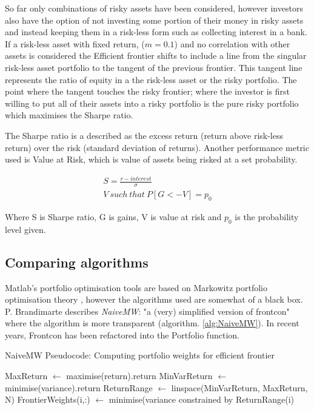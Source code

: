 \documentclass[a4paper,10pt, twocolumn]{article}
\newcommand*\Let[2]{\State #1 $\gets$ #2}
\begin{document}
So far only combinations of risky assets have been considered, however investors also have the option of not investing some portion of their money in risky assets and instead keeping them in a risk-less form such as collecting interest in a bank. If a risk-less asset with fixed return, ($m = 0.1$) and no correlation with other assets is considered the Efficient frontier shifts to include a line from the singular risk-less asset portfolio to the tangent of the previous frontier. This tangent line represents the ratio of equity in a the risk-less asset or the risky portfolio. The point where the tangent touches the risky frontier; where the investor is first willing to put all of their assets into a risky portfolio is the pure risky portfolio which maximises the Sharpe ratio. 

The Sharpe ratio is a described as the excess return (return above risk-less return) over the risk (standard deviation of returns). Another performance metric used is Value at Risk, which is value of assets being risked at a set probability.

\begin{align}
S = \frac{r - interest}{\sigma} \\
V  \ such\  that\   P[G < -V] = p_0
\label{eq:sharpe}
\end{align}

Where S is Sharpe ratio, G is gains, V is value at risk and $p_0$ is the probability level given. 


\subsection{Comparing algorithms}

Matlab's portfolio optimisation tools are based on Markowitz portfolio optimisation theory \cite{Portfolio}, however the algorithms used are somewhat of a black box. P. Brandimarte describes \textit{NaiveMW}: "a (very) simplified version of frontcon" \cite{TextBook} where the algorithm is more transparent (algorithm. \ref{alg:NaiveMW}). In recent years, Frontcon has been refactored into the Portfolio function. 

\begin{algorithm}
  \caption{NaiveMW Pseudocode: Computing portfolio weights for efficient frontier \cite{TextBook}
    \label{alg:NaiveMW}}
  \begin{algorithmic}[1]
    \Statex
      \Let{MaxReturn}{maximise(return).return} 
      \Let{MinVarReturn}{minimise(variance).return}
      \Let{ReturnRange}{linspace(MinVarReturn, MaxReturn, N)}
        \Let{FrontierWeights(i,:)}{minimise(variance constrained by ReturnRange(i)} 
      \EndFor
  \end{algorithmic}
\end{algorithm}
\end{document}
